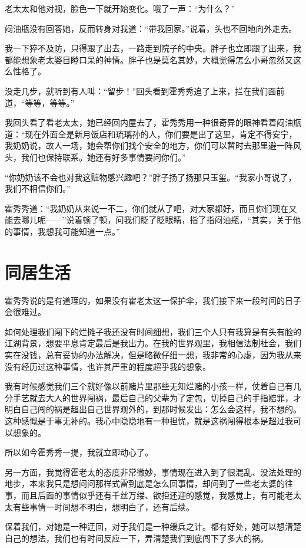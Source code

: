 老太太和他对视，脸色一下就开始变化。哦了一声：“为什么？”

闷油瓶没有回答她，反而转身对我道：“带我回家。”说着，头也不回地向外走去。

我一下猝不及防，只得跟了出去，一路走到院子的中央。胖子也立即跟了出来，我都能想象老太婆目瞪口呆的神情。胖子也是莫名其妙，大概觉得怎么小哥忽然又这么性格了。

没走几步，就听到有人叫：“留步！”回头看到霍秀秀追了上来，拦在我们面前道，“等等，等等。”

我回头看了看老太太，她已经回内屋去了，霍秀秀用一种很奇异的眼神看着闷油瓶道：“现在外面全是新月饭店和琉璃孙的人，你们要是出了这里，肯定不得安宁，我奶奶说，故人一场，她会帮你们找个安全的地方，你们可以暂时去那里避一阵风头，我们也保持联系。她还有好多事情要问你们。”

“你奶奶该不会也对我这赃物感兴趣吧？”胖子扬了扬那只玉玺。“我家小哥说了，我们不相信你们。”

霍秀秀道：“我奶奶从来说一不二，你们就从了吧，对大家都好，而且你们现在又能去哪儿呢——”说着顿了顿，问我们眨了眨眼睛，指了指闷油瓶，“其实，关于他的事情，我想我可能知道一点。”

\chapter{同居生活}

霍秀秀说的是有道理的，如果没有霍老太这一保护伞，我们接下来一段时间的日子会很难过。

如何处理我们闯下的烂摊子我还没有时间细想，我们三个人只有我算是有头有脸的江湖背景，想要平息肯定最后是我出力。在我的世界观里，我相信法制社会，我们实在没钱，总有妥协的办法解决，但是略微仔细一想，我非常的心虚，因为我从来没有经历过这种事情，也许其严重的程度超乎我的想象。

我有时候感觉我们三个就好像以前赌片里那些无知烂赌的小孩一样，仗着自己有几分手艺就去大人的世界闯祸，最后自己的父辈为了定包，切掉自己的手指赔罪，才明白自己闯的祸是超出自己世界观外的，到那时候发出：怎么会这样，我不想的。这种感慨是于事无补的。我心中隐隐地有一种担忧，就是这祸闯得根本是超过我可以想象的。

所以如今霍秀秀一提，我就立即动心了。

另一方面，我觉得霍老太的态度非常微妙，事情现在进入到了很混乱、没法处理的地步，本来我只是想问问那样式雷到底是怎么回事情，却问到了一些老太婆的往事，而且后面的事情似乎还有千丝万缕、欲拒还迎的感觉，我感觉上，有可能老太太有些事情一时间想不明白，想明白了，还有后续。

保着我们，对她是一种迂回，对于我们是一种缓兵之计。都有好处，她可以想清楚自己的想法，我们也有时间反应一下，弄清楚我们到底闯下了多大的祸。

